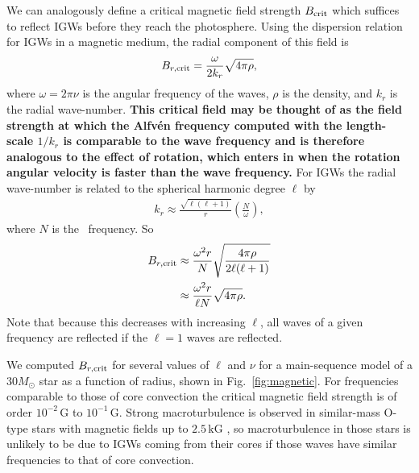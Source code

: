 \documentclass[twocolumn]{aastex63}
\begin{document}
We can analogously define a critical magnetic field strength $B_{\rm crit}$ which suffices to reflect IGWs before they reach the photosphere. 
Using the dispersion relation for IGWs in a magnetic medium, the radial component of this field is~\citep{2015Sci...350..423F}
\begin{align}
	B_{r, \rm crit} = \frac{\omega}{2 k_r}\sqrt{4\pi \rho},
\end{align}
where $\omega=2\pi\nu$ is the angular frequency of the waves, $\rho$ is the density, and $k_r$ is the radial wave-number.
{\bf This critical field may be thought of as the field strength at which the Alfv{\'e}n frequency computed with the length-scale $1/k_r$ is comparable to the wave frequency and is therefore analogous to the effect of rotation, which enters in when the rotation angular velocity is faster than the wave frequency.}
For IGWs the radial wave-number is related to the spherical harmonic degree $\ell$ by
\begin{align}\label{eq:kr}
	k_r \approx \frac{\sqrt{\ell(\ell+1)}}{r}\left(\frac{N}{\omega}\right),
\end{align}
where $N$ is the \brvs\ frequency.
So
\begin{align}
	\label{eq:Brcrit}
	B_{r, \rm crit} &\approx \frac{\omega^2 r}{N}\sqrt{\frac{4\pi \rho}{2\ell(\ell+1)}} \\
	&\approx \frac{\omega^2 r}{\ell N}\sqrt{4\pi \rho}.
\end{align}
Note that because this decreases with increasing $\ell$, all waves of a given frequency are reflected if the $\ell=1$ waves are reflected.

We computed $B_{r, \rm crit}$ for several values of $\ell$ and $\nu$ for a main-sequence model of a $30 M_\odot$ star as a function of radius, shown in Fig.~\ref{fig:magnetic}.
For frequencies comparable to those of core convection the critical magnetic field strength is of order $10^{-2}\,\mathrm{G}$ to $10^{-1}\,\mathrm{G}$.
Strong macroturbulence is observed in similar-mass O-type stars with magnetic fields up to $2.5\,\mathrm{kG}$ \citep[e.g. HD~191612,][]{10.1093/mnras/stt921}, so macroturbulence in those stars is unlikely to be due to IGWs coming from their cores if those waves have similar frequencies to that of core convection.
\end{document}
